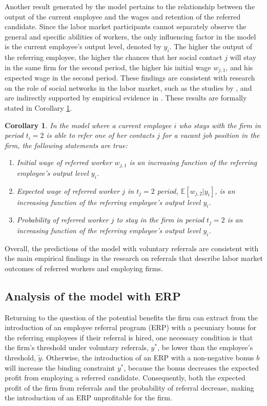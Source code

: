 \documentclass[12pt]{article}
\newtheorem{corollary}[theorem]{Corollary}
\begin{document}
Another result generated by the model pertains to the relationship between the output of the current employee and the wages and retention of the referred candidate. Since the labor market participants cannot separately observe the general and specific abilities of workers, the only influencing factor in the model is the current employee's output level, denoted by $y_i$. The higher the output of the referring employee, the higher the chances that her social contact $j$ will stay in the same firm for the second period, the higher his initial wage $w_{j,1}$, and his expected wage in the second period. These findings are consistent with research on the role of social networks in the labor market, such as the studies by \cite{saloner1985old, simon1992matchmaker}, and are indirectly supported by empirical evidence in \cite{pallais2016referential, lalanne2016old, lalanne2021social}. These results are formally stated in Corollary \ref{cor:relation_current_empl}.
\begin{corollary}\label{cor:relation_current_empl}
    In the model where a current employee $i$ who stays with the firm in period $t_i = 2$ is able to refer one of her contacts $j$ for a vacant job position in the firm, the following statements are true:
    \begin{enumerate}[label={\roman*})]
        \item Initial wage of referred worker $w_{j,1}$ is an increasing function of the referring employee's output level $y_i$.
        \item Expected wage of referred worker $j$ in $t_j = 2$ period,  $\mathbb{E}[w_{j,2}|y_i]$, is an increasing function of the referring employee's output level $y_i$.
        \item Probability of referred worker $j$ to stay in the firm in period $t_j = 2$ is an increasing function of the referring employee's output level $y_i$.
    \end{enumerate}
\end{corollary}

Overall, the predictions of the model with voluntary referrals are consistent with the main empirical findings in the research on referrals that describe labor market outcomes of referred workers and employing firms. 

\subsection{Analysis of the model with ERP}

Returning to the question of the potential benefits the firm can extract from the introduction of an employee referral program (ERP) with a pecuniary bonus for the referring employees if their referral is hired, one necessary condition is that the firm's threshold under voluntary referrals, $y^*$, be lower than the employee's threshold, $\tilde{y}$. Otherwise, the introduction of an ERP with a non-negative bonus $b$ will increase the binding constraint $y^*$, because the bonus decreases the expected profit from employing a referred candidate. Consequently, both the expected profit of the firm from referrals and the probability of referral decrease, making the introduction of an ERP unprofitable for the firm.
\end{document}

